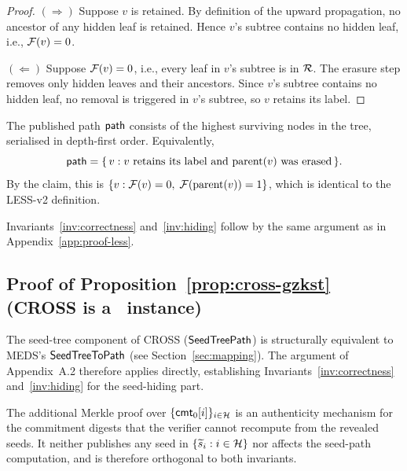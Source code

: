 \begin{proof}
$(\Rightarrow)$
Suppose $v$ is retained.  By definition of the upward propagation, no
ancestor of any hidden leaf is retained.  Hence $v$'s subtree contains no
hidden leaf, i.e., $\mathcal{F}(v) = 0$.

$(\Leftarrow)$
Suppose $\mathcal{F}(v) = 0$, i.e., every leaf in $v$'s subtree is in $\mathcal{R}$.
The erasure step removes only hidden leaves and their ancestors.  Since
$v$'s subtree contains no hidden leaf, no removal is triggered in
$v$'s subtree, so $v$ retains its label.
\end{proof}


The published path $\mathsf{path}$ consists of the highest surviving nodes in
the tree, serialised in depth-first order. Equivalently,
\[
\mathsf{path}
 = \{\, v : v \text{ retains its label and }
\mathrm{parent}(v) \text{ was erased} \,\}.
\]
By the claim, this is $\{v : \mathcal{F}(v) = 0,\; \mathcal{F}(\mathrm{parent}(v)) = 1\}$,
which is identical to the LESS-v2 definition.

Invariants~\ref{inv:correctness} and~\ref{inv:hiding} follow by the same
argument as in Appendix~\ref{app:proof-less}.

\subsection{Proof of Proposition~\ref{prop:cross-gzkst}
  (CROSS is a \GZKST\ instance)}
\label{app:proof-cross}

The seed-tree component of CROSS ($\mathsf{SeedTreePath}$) is structurally equivalent
to MEDS's $\mathsf{SeedTreeToPath}$ (see Section~\ref{sec:mapping}).  The argument of
Appendix~A.2 therefore applies directly, establishing
Invariants~\ref{inv:correctness} and~\ref{inv:hiding} for the seed-hiding part.

The additional Merkle proof over $\{\mathsf{cmt}_0[i]\}_{i \in \mathcal{H}}$ is an
authenticity mechanism for the commitment digests that the verifier cannot
recompute from the revealed seeds.  It neither publishes any seed in
$\{\widetilde{s}_i : i \in \mathcal{H}\}$ nor affects the seed-path computation, and is
therefore orthogonal to both invariants.


